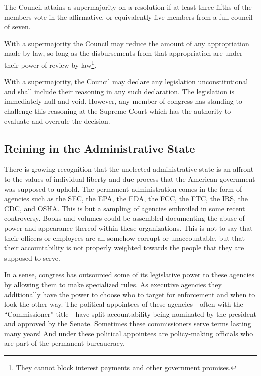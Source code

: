 \documentclass{article}
\newcommand{\quotes}[1]{``#1''}
\begin{document}
\begin{quoting}
The Council attains a supermajority on a resolution if at least three fifths of the members vote in the affirmative, or equivalently five members from a full council of seven.

With a supermajority the Council may reduce the amount of any appropriation made by law, so long as the disbursements from that appropriation are under their power of review by law\footnote{They cannot block interest payments and other government promises.}.

With a supermajority, the Council may declare any legislation unconstitutional and shall include their reasoning in any such declaration. The legislation is immediately null and void. However, any member of congress has standing to challenge this reasoning at the Supreme Court which has the authority to evaluate and overrule the decision.
\end{quoting}

\subsection{Reining in the Administrative State}

There is growing recognition that the unelected administrative state is an affront to the values of individual liberty and due process that the American government was supposed to uphold. The permanent administration comes in the form of agencies such as the SEC, the EPA, the FDA, the FCC, the FTC, the IRS, the CDC, and OSHA. This is but a sampling of agencies embroiled in some recent controversy. Books and volumes could be assembled documenting the abuse of power and appearance thereof within these organizations. This is not to say that their officers or employees are all somehow corrupt or unaccountable, but that their accountability is not properly weighted towards the people that they are supposed to serve.

In a sense, congress has outsourced some of its legislative power to these agencies by allowing them to make specialized rules. As executive agencies they additionally have the power to choose who to target for enforcement and when to look the other way. The political appointees of these agencies - often with the \quotes{Commissioner} title - have split accountability being nominated by the president and approved by the Senate. Sometimes these commissioners serve terms lasting many years! And under these political appointees are policy-making officials who are part of the permanent bureaucracy.
\end{document}

